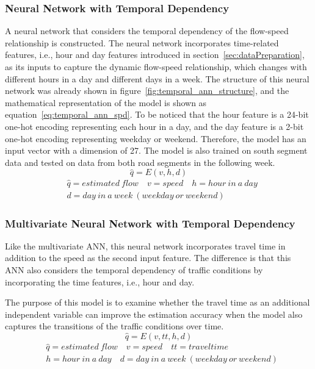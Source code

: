 \documentclass[english]{kththesis}
\begin{document}
\subsubsection{Neural Network with Temporal Dependency}
\label{subsubsec:temporalNeuralNetwork}
A neural network that considers the temporal dependency of the flow-speed relationship is constructed. The neural network incorporates time-related features, i.e., hour and day features introduced in section~\ref{sec:dataPreparation}, as its inputs to capture the dynamic flow-speed relationship, which changes with different hours in a day and different days in a week. The structure of this neural network was already shown in figure~\ref{fig:temporal_ann_structure}, and the mathematical representation of the model is shown as equation~\ref{eq:temporal_ann_spd}. To be noticed that the hour feature is a 24-bit one-hot encoding representing each hour in a day, and the day feature is a 2-bit one-hot encoding representing weekday or weekend. Therefore, the model has an input vector with a dimension of 27. The model is also trained on south segment data and tested on data from both road segments in the following week.
\begin{equation}
    \hat{q} = E(v,h,d)
    \label{eq:temporal_ann_spd}
\end{equation}
\begin{align*}
    & \hat{q} = estimated \ flow \quad v=speed \quad h=hour \ in \ a \ day \\ & d=day \ in \ a \ week \ (weekday \ or \ weekend)
\end{align*}

\subsubsection{Multivariate Neural Network with Temporal Dependency}
\label{subsubsec:temporalMultivariateNeuralNetwork}
Like the multivariate ANN, this neural network incorporates travel time in addition to the speed as the second input feature. The difference is that this ANN also considers the temporal dependency of traffic conditions by incorporating the time features, i.e., hour and day.

The purpose of this model is to examine whether the travel time as an additional independent variable can improve the estimation accuracy when the model also captures the transitions of the traffic conditions over time.
\begin{equation}
    \hat{q} = E(v, tt, h,d)
    \label{eq:temporal_ann_spd_tt}
\end{equation}
\begin{align*}
    & \hat{q} = estimated \ flow \quad v=speed \quad  tt=travel time \\
    & h=hour \ in \ a \ day \quad d=day \ in \ a \ week \ (weekday \ or \ weekend)
\end{align*}
\end{document}
